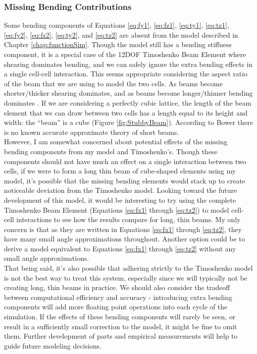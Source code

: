 {\subsubsection{Missing Bending Contributions}\label{sec:bendingdominance}

Some bending components of Equations \ref{eq:fy1}, \ref{eq:fz1}, \ref{eq:ty1}, \ref{eq:tz1}, \ref{eq:fy2}, \ref{eq:fz2}, \ref{eq:ty2},  and \ref{eq:tz2} are absent from the model described in Chapter \ref{chap:functionSim}.  Though the model still has a bending stiffness component, it is a special case of the 12DOF Timoshenko Beam Element where shearing dominates bending, and we can safely ignore the extra bending effects in a single cell-cell interaction.  This seems appropriate considering the aspect ratio of the beam that we are using to model the two cells.  As beams become shorter/thicker shearing dominates, and as beams become longer/thinner bending dominates \cite{Bower2009}.  If we are considering a perfectly cubic lattice, the length of the beam element that we can draw between two cells has a length equal to its height and width: the ``beam'' is a cube (Figure \ref{fig:StubbyBeam}).  According to Bower \cite{Bower2009} there is no known accurate approximate theory of short beams.\\

However, I am somewhat concerned about potential effects of the missing bending components from my model and Timoshenko's.  Though these components should not have much an effect on a single interaction between two cells, if we were to form a long thin beam of cube-shaped elements using my model, it's possible that the missing bending elements would stack up to create noticeable deviation from the Timoshenko model.  Looking toward the future development of this model, it would be interesting to try using the complete Timoshenko Beam Element (Equations \ref{eq:fx1} through \ref{eq:tz2}) to model cell-cell interactions to see how the results compare for long, thin beams. My only concern is that as they are written in Equations \ref{eq:fx1} through \ref{eq:tz2}, they have many small angle approximations throughout.  Another option could be to derive a model equivalent to Equations \ref{eq:fx1} through \ref{eq:tz2} without any small angle approximations.\\

That being said, it's also possible that adhering strictly to the Timoshenko model is not the best way to treat this system, especially since we will typically not be creating long, thin beams in practice.  We should also consider the tradeoff between computational efficiency and accuracy - introducing extra bending components will add more floating point operations into each cycle of the simulation.  If the effects of these bending components will rarely be seen, or result in a sufficiently small correction to the model, it might be fine to omit them.  Further development of parts and empirical measurements will help to guide future modeling decisions.

}
